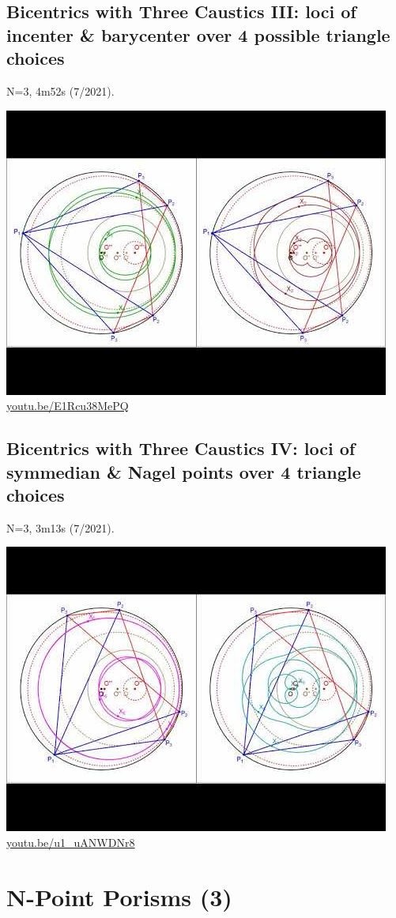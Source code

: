 \documentclass[12pt]{amsart}
\begin{document}
\subsection{Bicentrics with Three Caustics III: loci of incenter \& barycenter over 4 possible triangle choices}
\label{vid:E1Rcu38MePQ}
\noindent N=3, 4m52s (7/2021). 
\begin{center}\includegraphics[width=.5\textwidth]{pics/E1Rcu38MePQ.jpg} \\ 
\href{https://youtu.be/E1Rcu38MePQ}{\url{youtu.be/E1Rcu38MePQ}}\end{center}
% 
\subsection{Bicentrics with Three Caustics IV: loci of symmedian \& Nagel points over 4 triangle choices}
\label{vid:u1_uANWDNr8}
\noindent N=3, 3m13s (7/2021). 
\begin{center}\includegraphics[width=.5\textwidth]{pics/u1_uANWDNr8.jpg} \\ 
\href{https://youtu.be/u1_uANWDNr8}{\url{youtu.be/u1\_uANWDNr8}}\end{center}
% 

\section{N-Point Porisms (3)}
\end{document}
